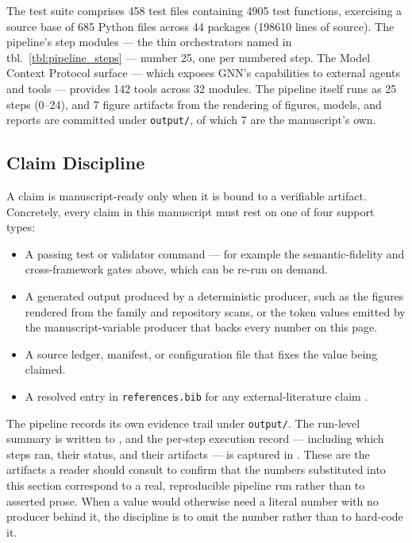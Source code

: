 \documentclass[
  english,
  9pt,
]{extarticle}
\providecommand{\tightlist}{%
  \setlength{\itemsep}{0pt}\setlength{\parskip}{0pt}}
\begin{document}
The test suite comprises 458 test files containing 4905 test functions,
exercising a source base of 685 Python files across 44 packages (198610
lines of source). The pipeline's step modules --- the thin orchestrators
named in tbl.~\ref{tbl:pipeline_steps} --- number 25, one per numbered
step. The Model Context Protocol surface --- which exposes GNN's
capabilities to external agents and tools --- provides 142 tools across
32 modules. The pipeline itself runs as 25 steps (0--24), and 7 figure
artifacts from the rendering of figures, models, and reports are
committed under \texttt{output/}, of which 7 are the manuscript's own.

\subsection{Claim Discipline}\label{claim-discipline}

A claim is manuscript-ready only when it is bound to a verifiable
artifact. Concretely, every claim in this manuscript must rest on one of
four support types:

\begin{itemize}
\tightlist
\item
  A passing test or validator command --- for example the
  semantic-fidelity and cross-framework gates above, which can be re-run
  on demand.
\item
  A generated output produced by a deterministic producer, such as the
  figures rendered from the family and repository scans, or the token
  values emitted by the manuscript-variable producer that backs every
  number on this page.
\item
  A source ledger, manifest, or configuration file that fixes the value
  being claimed.
\item
  A resolved entry in \texttt{references.bib} for any
  external-literature claim \citep{friston2010, parr2022}.
\end{itemize}

The pipeline records its own evidence trail under \texttt{output/}. The
run-level summary is written to , and
the per-step execution record --- including which steps ran, their
status, and their artifacts --- is captured in
. These are the artifacts a reader
should consult to confirm that the numbers substituted into this section
correspond to a real, reproducible pipeline run rather than to asserted
prose. When a value would otherwise need a literal number with no
producer behind it, the discipline is to omit the number rather than to
hard-code it.
\end{document}
